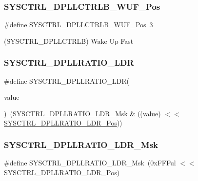 \subsubsection{\texorpdfstring{SYSCTRL\_DPLLCTRLB\_WUF\_Pos}{SYSCTRL\_DPLLCTRLB\_WUF\_Pos}}
{\footnotesize\ttfamily \#define S\+Y\+S\+C\+T\+R\+L\+\_\+\+D\+P\+L\+L\+C\+T\+R\+L\+B\+\_\+\+W\+U\+F\+\_\+\+Pos~3}



(S\+Y\+S\+C\+T\+R\+L\+\_\+\+D\+P\+L\+L\+C\+T\+R\+LB) Wake Up Fast 

\mbox{\label{group___s_a_m_d21___s_y_s_c_t_r_l_ga1c5b12f6409f9d10f2451d6cdf116065}} 
\subsubsection{\texorpdfstring{SYSCTRL\_DPLLRATIO\_LDR}{SYSCTRL\_DPLLRATIO\_LDR}}
{\footnotesize\ttfamily \#define S\+Y\+S\+C\+T\+R\+L\+\_\+\+D\+P\+L\+L\+R\+A\+T\+I\+O\+\_\+\+L\+DR(\begin{DoxyParamCaption}\item[{}]{value }\end{DoxyParamCaption})~(\mbox{\hyperlink{group___s_a_m_d21___s_y_s_c_t_r_l_ga3c5e034ed9b9a16884741f783e1215b4}{S\+Y\+S\+C\+T\+R\+L\+\_\+\+D\+P\+L\+L\+R\+A\+T\+I\+O\+\_\+\+L\+D\+R\+\_\+\+Msk}} \& ((value) $<$$<$ \mbox{\hyperlink{group___s_a_m_d21___s_y_s_c_t_r_l_gab84b0699148696285e95394ae4624f7a}{S\+Y\+S\+C\+T\+R\+L\+\_\+\+D\+P\+L\+L\+R\+A\+T\+I\+O\+\_\+\+L\+D\+R\+\_\+\+Pos}}))}

\mbox{\label{group___s_a_m_d21___s_y_s_c_t_r_l_ga3c5e034ed9b9a16884741f783e1215b4}} 
\subsubsection{\texorpdfstring{SYSCTRL\_DPLLRATIO\_LDR\_Msk}{SYSCTRL\_DPLLRATIO\_LDR\_Msk}}
{\footnotesize\ttfamily \#define S\+Y\+S\+C\+T\+R\+L\+\_\+\+D\+P\+L\+L\+R\+A\+T\+I\+O\+\_\+\+L\+D\+R\+\_\+\+Msk~(0x\+F\+F\+Ful $<$$<$ S\+Y\+S\+C\+T\+R\+L\+\_\+\+D\+P\+L\+L\+R\+A\+T\+I\+O\+\_\+\+L\+D\+R\+\_\+\+Pos)}

